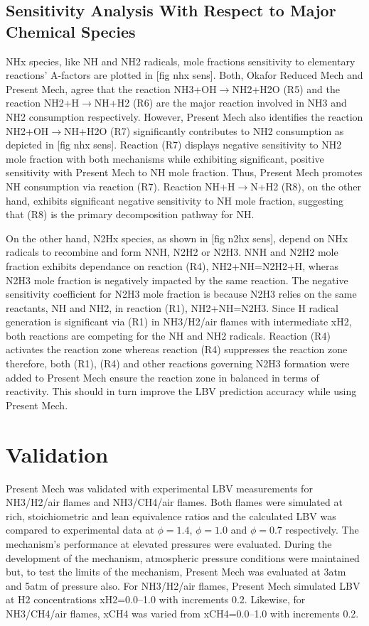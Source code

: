\documentclass[10pt,twocolumn]{icfd2026paper}
\begin{document}
\subsection{Sensitivity Analysis With Respect to Major Chemical Species}

NHx species, like NH and NH2 radicals, mole fractions sensitivity to elementary reactions' A-factors are plotted in
[fig nhx sens]. Both, Okafor Reduced Mech and Present Mech, agree that the reaction NH3+OH$\rightarrow$NH2+H2O (R5) and
the reaction NH2+H$\rightarrow$NH+H2 (R6) are the major reaction involved in NH3 and NH2 consumption respectively.
However, Present Mech also identifies the reaction NH2+OH$\rightarrow$NH+H2O (R7) significantly contributes to NH2
consumption as depicted in [fig nhx sens]. Reaction (R7) displays negative sensitivity to NH2 mole fraction with both
mechanisms while exhibiting significant, positive sensitivity with Present Mech to NH mole fraction. Thus, Present Mech
promotes NH consumption via reaction (R7). Reaction NH+H$\rightarrow$N+H2 (R8), on the other hand, exhibits significant
negative sensitivity to NH mole fraction, suggesting that (R8) is the primary decomposition pathway for NH.

On the other hand, N2Hx species, as shown in [fig n2hx sens], depend on NHx radicals to recombine and form NNH,
N2H2 or N2H3. NNH and N2H2 mole fraction exhibits dependance on reaction (R4), NH2+NH=N2H2+H, wheras N2H3 mole fraction
is negatively impacted by the same reaction. The negative sensitivity coefficient for N2H3 mole fraction is because N2H3
relies on the same reactants, NH and NH2, in reaction (R1), NH2+NH=N2H3. Since H radical generation is significant via
(R1) in NH3/H2/air flames with intermediate xH2, both reactions are competing for the NH and NH2 radicals. Reaction (R4)
activates the reaction zone whereas reaction (R4) suppresses the reaction zone therefore, both (R1), (R4) and other
reactions governing N2H3 formation were added to Present Mech ensure the reaction zone in balanced in terms of
reactivity. This should in turn improve the LBV prediction accuracy while using Present Mech.

\section{Validation}

Present Mech was validated with experimental LBV measurements for NH3/H2/air flames and NH3/CH4/air flames. Both flames
were simulated at rich, stoichiometric and lean equivalence ratios and the calculated LBV was compared to experimental
data at $\phi=1.4$, $\phi=1.0$ and $\phi=0.7$ respectively. The mechanism's performance at elevated pressures were
evaluated. During the development of the mechanism, atmospheric pressure conditions were maintained but, to test the
limits of the mechanism, Present Mech was evaluated at 3atm and 5atm of pressure also. For NH3/H2/air flames, Present
Mech simulated LBV at H2 concentrations xH2=0.0--1.0 with increments 0.2. Likewise, for NH3/CH4/air flames, xCH4 was
varied from xCH4=0.0--1.0 with increments 0.2.
\end{document}
